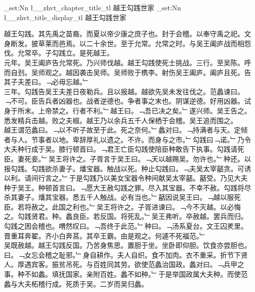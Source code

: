 \documentclass{zhvt-classic}
\begin{document}
\clearpage
\ExplSyntaxOn
\tl_set:Nn \l__zhvt_chapter_title_tl { 越王勾践世家 }
\tl_set:Nn \l__zhvt_title_display_tl { 越王勾践世家 }
\ExplSyntaxOff
\maketitle


\hspace*{2em}越王勾践。其先禹之苗裔。而夏以帝少康之庶子也。封于会稽。以奉守禹之祀。文身断发。披草莱而邑焉。以二十余世。至于允常。允常之时。与吴王阖庐战而相怨伐。允常卒。子勾践立。是死越王。\\
\hspace*{2em}元年。吴王阖庐告允常死。乃兴师伐越。越王勾践使死士挑战。三行。至吴陈。呼而自刭。吴师观之。越因袭击吴师。吴师败于槜李。射伤吴王阖庐。阖庐且死。告其子夫差曰。﹁必毋忘越。﹂\\
\hspace*{2em}三年。勾践告吴王夫差日夜勒兵。且以报越。越欲先吴未发往伐之。范蠡谏曰。﹁不可。臣告兵者凶器也。战者逆德也。争者事之末也。阴谋逆德。好用凶器。试身于所末。上帝禁之。行者不利。﹂越王曰。﹁吾已决之矣。﹂遂兴师。吴王告之。悉发精兵击越。败之夫椒。越王乃以余兵五千人保栖于会稽。吴王追而围之。\\
\hspace*{2em}越王谓范蠡曰。﹁以不听子故至于此。死之奈何。﹂蠡对曰。﹁持满者与天。定倾者与人。节事者以地。卑辞厚礼以遗之。不许。而身与之市。﹂勾践曰﹁诺。﹂乃令大夫种行成于吴。膝行顿首曰。﹁君王亡臣勾践使陪臣种敢告下执事。勾践请死臣。妻死妾。﹂吴王将许之。子胥言于吴王曰。﹁天以越赐吴。勿许也。﹂种还。以报勾践。勾践欲杀妻子。燔宝器。触战以死。种止勾践曰。﹁夫吴太宰嚭贪。可诱以利。请间行言之。﹂于是勾践乃以美女宝器令种间献吴太宰嚭。嚭受。乃见大夫种于吴王。种顿首言曰。﹁愿大王赦勾践之罪。尽入其宝器。不幸不赦。勾践将尽杀其妻子。燔其宝器。悉五千人触战。必有当也。﹂嚭因说吴王曰。﹁越以服死臣。若将赦之。此国之利也。﹂吴王将许之。子胥进谏曰。﹁今不灭越。以必悔之。勾践贤君。种。蠡良臣。若反国。将死乱。﹂吴王弗听。卒赦越。罢兵而归。\\
\hspace*{2em}勾践之困会稽也。喟然叹曰。﹁吾终于此范。﹂种曰。﹁汤系夏台。文王囚羑里。晋重耳奔翟。齐小白奔莒。其卒王霸。由是观之。何遽不死福范。﹂\\
\hspace*{2em}吴既赦越。越王勾践反国。乃苦身焦思。置胆于坐。坐卧即仰胆。饮食亦尝胆也。曰。﹁女忘会稽之耻邪。﹂身自耕作。夫人自织。食不加肉。衣不重采。折节下贤人。厚遇宾客。振贫吊死。与百姓同其劳。欲使范蠡治国政。蠡对曰。﹁兵甲之事。种不如蠡。填抚国家。亲附百姓。蠡不如种。﹂于是举国政属大夫种。而使范蠡与大夫柘稽行成。死质于吴。二岁而吴归蠡。\\
\end{document}
